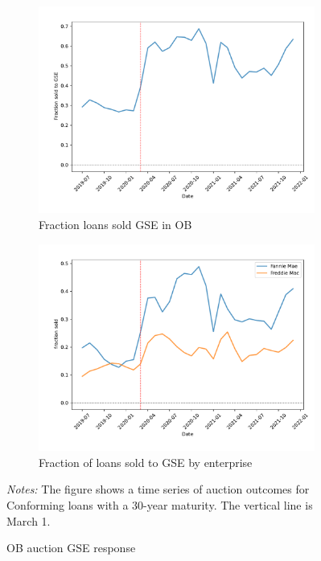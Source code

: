 \documentclass[11pt,a4paper]{article}
\begin{document}
\begin{figure}[h]
  \centering
  \begin{subfigure}[b]{0.49\textwidth}
      \includegraphics[width=0.998\textwidth]{../results/figures/sold_GSE_mean_mat30_loan1_timeseries_nrmonthly_2.5_4_.pdf}
      \caption{Fraction loans sold GSE in OB }
     \end{subfigure}
     \begin{subfigure}[b]{0.49\textwidth}
      \includegraphics[width=0.998\textwidth]{../results/figures/sold_FreddieBid_mean_mat30_loan1_timeseries_nrmonthly_2.5_4_.pdf}
      \caption{ Fraction of loans sold to GSE by enterprise }\label{fig:gse_loans}
     \end{subfigure}
     \caption{OB auction  GSE response } 
   \begin{minipage}{\textwidth}
      \footnotesize{\textit{Notes:} The figure shows a time series of auction outcomes for Conforming loans with a 30-year maturity. The vertical line is March 1.  } 
      \end{minipage}
\end{figure}
\end{document}
